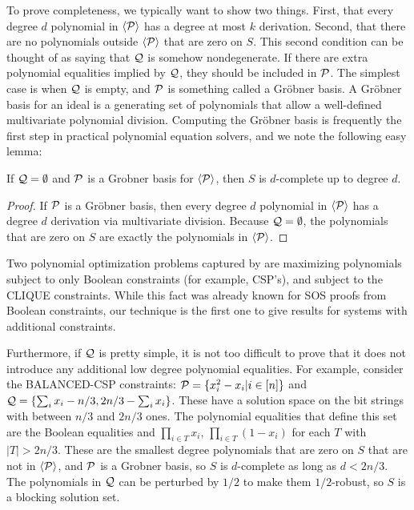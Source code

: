 To prove completeness, we typically want to show two things. First, that every degree $d$ polynomial in $\langle \mathcal P\rangle$ has a degree at most $k$ derivation. Second, that there are no polynomials outside $\langle \mathcal P\rangle$ that are zero on $S$. This second condition can be thought of as saying that $\mathcal Q$ is somehow nondegenerate. If there are extra polynomial equalities implied by $\mathcal Q$, they should be included in $\mathcal P$. The simplest case is when $\mathcal Q$ is empty, and $\mathcal P$ is something called a Gr\"obner basis. A Gr\"obner basis for an ideal is a generating set of polynomials that allow a well-defined multivariate polynomial division. Computing the Gr\"obner basis is frequently the first step in practical polynomial equation solvers, and we note the following easy lemma:
\begin{lemma}\label{lem:grobner}
If $\mathcal Q = \emptyset$ and $\mathcal P$ is a Grobner basis for $\langle \mathcal P\rangle$, then $S$ is $d$-complete up to degree $d$. 
\end{lemma}
\begin{proof}
If $\mathcal P$ is a Gr\"obner basis, then every degree $d$ polynomial in $\langle \mathcal P\rangle$ has a degree $d$ derivation via multivariate division. Because $\mathcal Q = \emptyset$, the polynomials that are zero on $S$ are exactly the polynomials in $\langle \mathcal P\rangle$. 
\end{proof}
Two polynomial optimization problems captured by  are maximizing polynomials subject to only Boolean constraints (for example, CSP's), and subject to the CLIQUE constraints. While this fact was already known for SOS proofs from Boolean constraints, our technique is the first one to give results for systems with additional constraints. 

Furthermore, if $\mathcal Q$ is pretty simple, it is not too difficult to prove that it does not introduce any additional low degree polynomial equalities. For example, consider the BALANCED-CSP constraints: $\mathcal P = \{x_i^2-x_i | i \in [n]\}$ and $\mathcal Q = \{\sum_i x_i - n/3, 2n/3 - \sum_i x_i\}$. These have a solution space on the bit strings with between $n/3$ and $2n/3$ ones. The polynomial equalities that define this set are the Boolean equalities and $\prod_{i \in T} x_i$, $\prod_{i \in T} (1-x_i)$ for each $T$ with $|T| > 2n/3$. These are the smallest degree polynomials that are zero on $S$ that are not in $\langle \mathcal P\rangle$, and $\mathcal P$ is a Grobner basis, so $S$ is $d$-complete as long as $d < 2n/3$. The polynomials in $\mathcal Q$ can be perturbed by $1/2$ to make them $1/2$-robust, so $S$ is a blocking solution set. 

